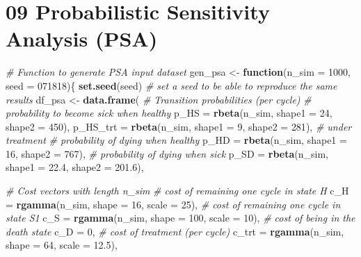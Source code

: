 \documentclass[]{article}
\newenvironment{Shaded}{\begin{snugshade}}{\end{snugshade}}
\newcommand{\KeywordTok}[1]{\textcolor[rgb]{0.13,0.29,0.53}{\textbf{#1}}}
\newcommand{\DataTypeTok}[1]{\textcolor[rgb]{0.13,0.29,0.53}{#1}}
\newcommand{\DecValTok}[1]{\textcolor[rgb]{0.00,0.00,0.81}{#1}}
\newcommand{\FloatTok}[1]{\textcolor[rgb]{0.00,0.00,0.81}{#1}}
\newcommand{\StringTok}[1]{\textcolor[rgb]{0.31,0.60,0.02}{#1}}
\newcommand{\CommentTok}[1]{\textcolor[rgb]{0.56,0.35,0.01}{\textit{#1}}}
\newcommand{\ControlFlowTok}[1]{\textcolor[rgb]{0.13,0.29,0.53}{\textbf{#1}}}
\newcommand{\NormalTok}[1]{#1}
\begin{document}
\section{09 Probabilistic Sensitivity Analysis
(PSA)}\label{probabilistic-sensitivity-analysis-psa}

\begin{Shaded}
\begin{Highlighting}[]
\CommentTok{# Function to generate PSA input dataset}
\NormalTok{gen_psa <-}\StringTok{ }\ControlFlowTok{function}\NormalTok{(}\DataTypeTok{n_sim =} \DecValTok{1000}\NormalTok{, }\DataTypeTok{seed =} \DecValTok{071818}\NormalTok{)\{}
  \KeywordTok{set.seed}\NormalTok{(seed) }\CommentTok{# set a seed to be able to reproduce the same results}
\NormalTok{  df_psa <-}\StringTok{ }\KeywordTok{data.frame}\NormalTok{(}
    \CommentTok{# Transition probabilities (per cycle)}
    \CommentTok{# probability to become sick when healthy}
    \DataTypeTok{p_HS     =} \KeywordTok{rbeta}\NormalTok{(n_sim, }\DataTypeTok{shape1 =} \DecValTok{24}\NormalTok{, }\DataTypeTok{shape2 =} \DecValTok{450}\NormalTok{), }
    \DataTypeTok{p_HS_trt =} \KeywordTok{rbeta}\NormalTok{(n_sim, }\DataTypeTok{shape1 =} \DecValTok{9}\NormalTok{,  }\DataTypeTok{shape2 =} \DecValTok{281}\NormalTok{),   }\CommentTok{# under treatment}
    \CommentTok{# probability of dying when healthy}
    \DataTypeTok{p_HD     =} \KeywordTok{rbeta}\NormalTok{(n_sim, }\DataTypeTok{shape1 =} \DecValTok{16}\NormalTok{, }\DataTypeTok{shape2 =} \DecValTok{767}\NormalTok{),}
    \CommentTok{# probability of dying when sick}
    \DataTypeTok{p_SD     =} \KeywordTok{rbeta}\NormalTok{(n_sim, }\DataTypeTok{shape1 =} \FloatTok{22.4}\NormalTok{, }\DataTypeTok{shape2 =} \FloatTok{201.6}\NormalTok{), }

    \CommentTok{# Cost vectors with length n_sim}
    \CommentTok{# cost of remaining one cycle in state H}
    \DataTypeTok{c_H      =} \KeywordTok{rgamma}\NormalTok{(n_sim, }\DataTypeTok{shape =} \DecValTok{16}\NormalTok{, }\DataTypeTok{scale =} \DecValTok{25}\NormalTok{), }
    \CommentTok{# cost of remaining one cycle in state S1}
    \DataTypeTok{c_S      =} \KeywordTok{rgamma}\NormalTok{(n_sim, }\DataTypeTok{shape =} \DecValTok{100}\NormalTok{, }\DataTypeTok{scale =} \DecValTok{10}\NormalTok{), }
    \CommentTok{# cost of being in the death state}
    \DataTypeTok{c_D      =} \DecValTok{0}\NormalTok{, }
    \CommentTok{# cost of treatment (per cycle)}
    \DataTypeTok{c_trt    =} \KeywordTok{rgamma}\NormalTok{(n_sim, }\DataTypeTok{shape =} \DecValTok{64}\NormalTok{, }\DataTypeTok{scale =} \FloatTok{12.5}\NormalTok{),}
    

\end{Highlighting}
\end{Shaded}
\end{document}
